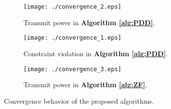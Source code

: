 \begin{figure*}[t!]
  \centering
  \begin{subfigure}[t]{0.32\textwidth}
    \texttt{[image: ./convergence\_2.eps]}
    \caption{Transmit power in \textbf{Algorithm \ref{alg:PDD}}.}
    \label{convergence_1}
  \end{subfigure}
  \begin{subfigure}[t]{0.32\textwidth}
    \texttt{[image: ./convergence\_1.eps]}
    \caption{Constraint violation in \textbf{Algorithm \ref{alg:PDD}}.}
    \label{convergence_2}
  \end{subfigure}
  \begin{subfigure}[t]{0.32\textwidth}
    \texttt{[image: ./convergence\_3.eps]}
    \caption{Transmit power in \textbf{Algorithm \ref{alg:ZF}}.}
    \label{convergence_3}
  \end{subfigure}
  \caption{Convergence behavior of the proposed algorithms.}
  \label{convergence}
  \vspace{-0.5cm}
\end{figure*} 

